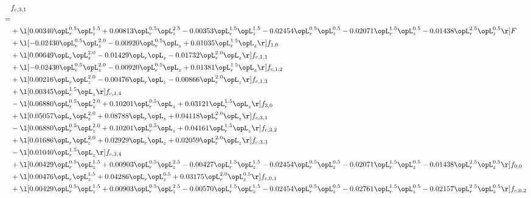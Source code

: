 \begin{alignat}{2} 
\label{eq:f_31_1} 
& f_{c,3,1} \nonumber \\ 
 = \\ 
& + \l[  0.00340 \opL_r^{0.5} \opL_z^{1.5} +  0.00813 \opL_r^{0.5} \opL_z^{2.5}   -0.00353 \opL_r^{1.5} \opL_z^{1.5}   -0.02454 \opL_r^{0.5} \opL_z^{0.5}   -0.02071 \opL_r^{1.5} \opL_z^{0.5}   -0.01438 \opL_r^{2.5} \opL_z^{0.5}  \r] F \nonumber \\ 
& + \l[  -0.02430 \opL_r^{0.5} \opL_z^{2.0}   -0.00920 \opL_r^{0.5} \opL_z +  0.01035 \opL_r^{1.5} \opL_z  \r] f_{1,0} \nonumber \\ 
& + \l[  0.00649 \opL_r \opL_z^{2.0}   -0.01429 \opL_r \opL_z   -0.01732 \opL_r^{2.0} \opL_z  \r] f_{c,1,1} \nonumber \\ 
& + \l[  -0.02430 \opL_r^{0.5} \opL_z^{2.0}   -0.00920 \opL_r^{0.5} \opL_z +  0.01381 \opL_r^{1.5} \opL_z  \r] f_{c,1,2} \nonumber \\ 
& + \l[  0.00216 \opL_r \opL_z^{2.0}   -0.00476 \opL_r \opL_z   -0.00866 \opL_r^{2.0} \opL_z  \r] f_{c,1,3} \nonumber \\ 
& + \l[  0.00345 \opL_r^{1.5} \opL_z  \r] f_{c,1,4} \nonumber \\ 
& - \l[  0.06880 \opL_r^{0.5} \opL_z^{2.0} +  0.10201 \opL_r^{0.5} \opL_z +  0.03121 \opL_r^{1.5} \opL_z  \r] f_{3,0} \nonumber \\ 
& + \l[  0.05057 \opL_r \opL_z^{2.0} +  0.08788 \opL_r \opL_z +  0.04118 \opL_r^{2.0} \opL_z  \r] f_{c,3,1} \nonumber \\ 
& - \l[  0.06880 \opL_r^{0.5} \opL_z^{2.0} +  0.10201 \opL_r^{0.5} \opL_z +  0.04161 \opL_r^{1.5} \opL_z  \r] f_{c,3,2} \nonumber \\ 
& + \l[  0.01686 \opL_r \opL_z^{2.0} +  0.02929 \opL_r \opL_z +  0.02059 \opL_r^{2.0} \opL_z  \r] f_{c,3,3} \nonumber \\ 
& - \l[  0.01040 \opL_r^{1.5} \opL_z  \r] f_{c,3,4} \nonumber \\ 
& + \l[  0.00429 \opL_r^{0.5} \opL_z^{1.5} +  0.00903 \opL_r^{0.5} \opL_z^{2.5}   -0.00427 \opL_r^{1.5} \opL_z^{1.5}   -0.02454 \opL_r^{0.5} \opL_z^{0.5}   -0.02071 \opL_r^{1.5} \opL_z^{0.5}   -0.01438 \opL_r^{2.5} \opL_z^{0.5}  \r] f_{0,0} \nonumber \\ 
& + \l[  0.00476 \opL_r \opL_z^{1.5} +  0.04286 \opL_r \opL_z^{0.5} +  0.03175 \opL_r^{2.0} \opL_z^{0.5}  \r] f_{c,0,1} \nonumber \\ 
& + \l[  0.00429 \opL_r^{0.5} \opL_z^{1.5} +  0.00903 \opL_r^{0.5} \opL_z^{2.5}   -0.00570 \opL_r^{1.5} \opL_z^{1.5}   -0.02454 \opL_r^{0.5} \opL_z^{0.5}   -0.02761 \opL_r^{1.5} \opL_z^{0.5}   -0.02157 \opL_r^{2.5} \opL_z^{0.5}  \r] f_{c,0,2} \nonumber \\ 

\end{alignat}
